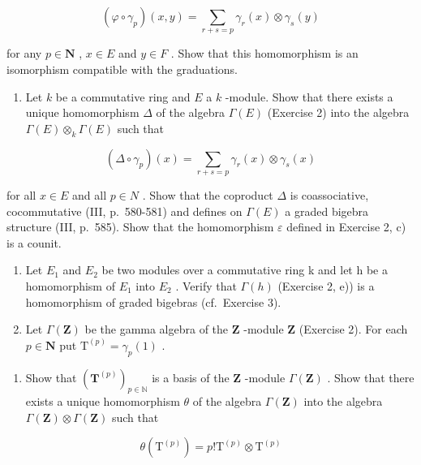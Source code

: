 \[
(\varphi \circ \gamma_ {p}) (x, y) = \sum_ {r + s = p} \gamma_ {r} (x) \otimes \gamma_ {s} (y)
\]

for any \(p \in \mathbf{N}\) , \(x \in E\) and \(y \in F\) . Show that this homomorphism is an isomorphism compatible with the graduations.

\begin{enumerate}
\def\labelenumi{\arabic{enumi})}
\setcounter{enumi}{2}
\tightlist
\item
  Let \(k\) be a commutative ring and \(E\) a \(k\) -module. Show that there exists a unique homomorphism \(\Delta\) of the algebra \(\Gamma(E)\) (Exercise 2) into the algebra \(\Gamma(E) \otimes_k \Gamma(E)\) such that
\end{enumerate}

\[
(\Delta \circ \gamma_ {p}) (x) = \sum_ {r + s = p} \gamma_ {r} (x) \otimes \gamma_ {s} (x)
\]

for all \(x \in E\) and all \(p \in N\) . Show that the coproduct \(\Delta\) is coassociative, cocommutative (III, p.~580-581) and defines on \(\Gamma(E)\) a graded bigebra structure (III, p.~585). Show that the homomorphism \(\varepsilon\) defined in Exercise 2, c) is a counit.

\begin{enumerate}
\def\labelenumi{\arabic{enumi})}
\setcounter{enumi}{3}
\item
  Let \(E_{1}\) and \(E_{2}\) be two modules over a commutative ring k and let h be a homomorphism of \(E_{1}\) into \(E_{2}\) . Verify that \(\Gamma(h)\) (Exercise 2, e)) is a homomorphism of graded bigebras (cf.~Exercise 3).
\item
  Let \(\Gamma(\mathbf{Z})\) be the gamma algebra of the \(\mathbf{Z}\) -module \(\mathbf{Z}\) (Exercise 2). For each \(p \in \mathbf{N}\) put \(\mathrm{T}^{(p)} = \gamma_p(1)\) .
\end{enumerate}

\begin{enumerate}
\def\labelenumi{\alph{enumi})}
\tightlist
\item
  Show that \((\mathbf{T}^{(p)})_{p\in \mathbb{N}}\) is a basis of the \(\mathbf{Z}\) -module \(\Gamma (\mathbf{Z})\) . Show that there exists a unique homomorphism \(\theta\) of the algebra \(\Gamma (\mathbf{Z})\) into the algebra \(\Gamma (\mathbf{Z})\otimes \Gamma (\mathbf{Z})\) such that
\end{enumerate}

\[
\theta \left(\mathrm{T} ^ {(p)}\right) = p! \mathrm{T} ^ {(p)} \otimes \mathrm{T} ^ {(p)}
\]

